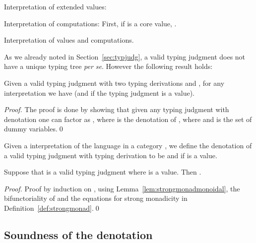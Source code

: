 \documentclass{llncs}
\newcommand{\mycaption}[1]{\caption{#1}\vspace{-5ex}}
\begin{document}
\begin{table*}[t]
{\begin{minipage}{6.5in}
\vspace{-1.5ex}
Interpretation of extended values:




\vspace{-1.5ex}
Interpretation of computations:
First, if  is a core value, .




\end{minipage}}
\tablenl
\mycaption{Interpretation of values and computations.}
\label{table:modelvaluejudg}
\label{table:modelcorevaluejudg}
\label{table:modelcompjudg}
\end{table*}




As we already noted in Section~\ref{sec:typjudg}, a valid typing
judgment does not have a unique typing tree {\em per se}. However the
following result holds:




\begin{theorem}
  Given a valid typing judgment with two typing derivations 
  and , for any interpretation  we have
   (and
   if the typing
  judgment is a value).
\end{theorem}

\begin{proof}
  The proof is done by showing that given any typing judgment
   with denotation  one can factor  as
  , where  is the denotation of ,
  where  and  is the set of
  dummy variables.\qed
\end{proof}

\begin{definition}\label{def:typjudgdenot}\rm
  Given a interpretation  of the language in a category
  , we define the denotation of a valid typing judgment
   with typing derivation  to be
   and
   if 
  is a value.
\end{definition}



\begin{lemma}\label{lem:valuemonad}
  Suppose that  is a valid typing judgment where
   is a value. Then .
\end{lemma}

\begin{proof}
  Proof by induction on , using
  Lemma~\ref{lem:strongmonadmonoidal}, the bifunctoriality of
   and the equations for strong monadicity in
  Definition~\ref{def:strongmonad}.\qed
\end{proof}

\subsection{Soundness of the denotation}
\end{document}
